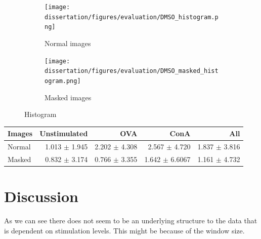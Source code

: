 \begin{figure}[h!]
    \centering
    \begin{subfigure}{0.45\textwidth}
        \texttt{[image: dissertation/figures/evaluation/DMSO\_histogram.png]}
        \caption{Normal images}
    \end{subfigure}
    \begin{subfigure}{0.45\textwidth}
        \texttt{[image: dissertation/figures/evaluation/DMSO\_masked\_histogram.png]}
        \caption{Masked images}
    \end{subfigure}
    \caption{Histogram}
\end{figure}

\begin{table}[h!]
\centering
\begin{tabular}{l|rrr|r}
\rowcolor[HTML]{EFEFEF}
Images & Unstimulated & OVA & ConA & All \\ \hline
Normal      & 1.013 $\pm$ 1.945  & 2.202 $\pm$ 4.308   & 2.567 $\pm$ 4.720  &   1.837 $\pm$ 3.816  \\ \hline
Masked      &    0.832 $\pm$ 3.174          & 0.766 $\pm$ 3.355  &  1.642 $\pm$ 6.6067   &   1.161 $\pm$ 4.732
\end{tabular}
\end{table}

\section{Discussion}

As we can see there does not seem to be an underlying structure to the data that is dependent on stimulation levels. This might be because of the window size.
